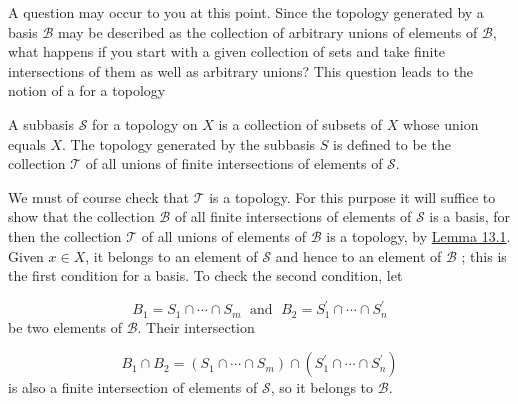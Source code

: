 A question may occur to you at this point. Since the topology generated by a basis \(\mathcal{B}\) may be described as the collection of arbitrary unions of elements of \(\mathcal{B}\), what happens if you start with a given collection of sets and take finite intersections of them as well as arbitrary unions? This question leads to the notion of a  for a topology

\begin{definition}
 A subbasis \(\mathcal{S}\) for a topology on \(X\) is a collection of subsets of \(X\) whose union equals \(X\). The topology generated by the subbasis \(S\) is defined to be the collection \(\mathcal{T}\) of all unions of finite intersections of elements of \(\mathcal{S}\).
\end{definition}

We must of course check that \(\mathcal{T}\) is a topology. For this purpose it will suffice to show that the collection \(\mathcal{B}\) of all finite intersections of elements of \(\mathcal{S}\) is a basis, for then the collection \(\mathcal{T}\) of all unions of elements of \(\mathcal{B}\) is a topology, by \hyperref[lem:13.1]{Lemma 13.1}. Given \(x \in X\), it belongs to an element of \(\mathcal{S}\) and hence to an element of \(\mathcal{B}\) ; this is the first condition for a basis. To check the second condition, let

\[
B_{1} = S_{1} \cap \cdots \cap {S}_{m}\;\text{ and }\;B_{2} = S_1^{\prime } \cap \cdots \cap {S}_n^{\prime }
\]
be two elements of \(\mathcal{B}\). Their intersection

\[
B_{1} \cap {B}_{2} = ( {S_{1} \cap \cdots \cap {S}_{m}}) \cap ( {S_1^{\prime } \cap \cdots \cap {S}_n^{\prime }})
\]
is also a finite intersection of elements of \(\mathcal{S}\), so it belongs to \(\mathcal{B}\).

